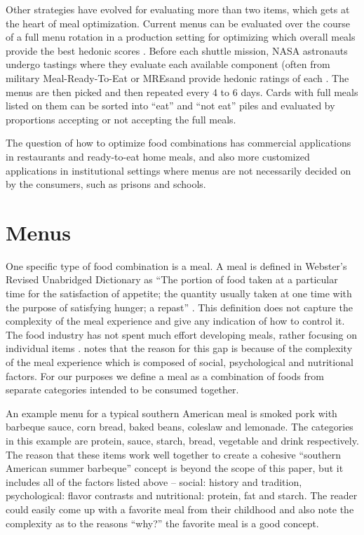 Other strategies have evolved for evaluating more than two items, which gets at the heart of meal optimization.  Current menus can be evaluated over the course of a full menu rotation in a production setting for optimizing which overall meals provide the best hedonic scores \citep{Pagliarini2005}. Before each shuttle mission, NASA astronauts undergo tastings where they evaluate each available component (often from military Meal-Ready-To-Eat or MREs\tm and provide hedonic ratings of each \citep{Kerwin2002}.  The menus are then picked and then repeated every 4 to 6 days.  Cards with full meals listed on them can be sorted into “eat” and “not eat” piles \citep{Jonsson1991} and evaluated by proportions accepting or not accepting the full meals.

The question of how to optimize food combinations has commercial applications in restaurants and ready-to-eat home meals, and also more customized applications in institutional settings where menus are not necessarily decided on by the consumers, such as prisons and schools.

\section{Menus}
One specific type of food combination is a meal.  A meal is defined in Webster’s Revised Unabridged Dictionary as “The portion of food taken at a particular time for the satisfaction of appetite; the quantity usually taken at one time with the purpose of satisfying hunger; a repast” \citep{Webster1913}.  This definition does not capture the complexity of the meal experience and give any indication of how to control it.  The food industry has not spent much effort developing meals, rather focusing on individual items \citep{Meiselman2000}.  \citet{Meiselman2000} notes that the reason for this gap is because of the complexity of the meal experience which is composed of social, psychological \citep[see][chap. 2]{Lawless2010} and nutritional factors.  For our purposes we define a meal as a combination of foods from separate categories intended to be consumed together. 
 
An example menu for a typical southern American meal is smoked pork with barbeque sauce, corn bread, baked beans, coleslaw and lemonade.  The categories in this example are protein, sauce, starch, bread, vegetable and drink respectively.  The reason that these items work well together to create a cohesive “southern American summer barbeque” concept is beyond the scope of this paper, but it includes all of the factors listed above – social: history and tradition, psychological: flavor contrasts \citep{Lawless1977,Lawless1979,Lawless1987,Lawless2010,Lawless2000} and nutritional: protein, fat and starch.  The reader could easily come up with a favorite meal from their childhood and also note the complexity as to the reasons “why?” the favorite meal is a good concept.  
 
